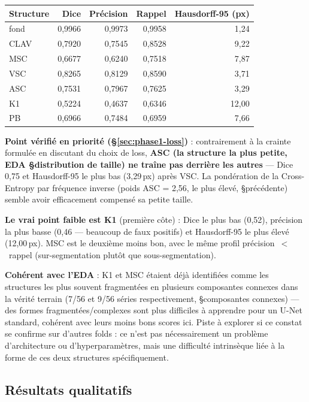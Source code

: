 \begin{center}
\begin{tabular}{lrrrr}
\toprule
Structure & Dice & Précision & Rappel & Hausdorff-95 (px) \\
\midrule
fond & 0,9966 & 0,9973 & 0,9958 & 1,24 \\
CLAV & 0,7920 & 0,7545 & 0,8528 & 9,22 \\
MSC  & 0,6677 & 0,6240 & 0,7518 & 7,87 \\
VSC  & 0,8265 & 0,8129 & 0,8590 & 3,71 \\
ASC  & 0,7531 & 0,7967 & 0,7625 & 3,29 \\
K1   & 0,5224 & 0,4637 & 0,6346 & 12,00 \\
PB   & 0,6966 & 0,7484 & 0,6959 & 7,66 \\
\bottomrule
\end{tabular}
\end{center}

\textbf{Point vérifié en priorité (\S\ref{sec:phase1-loss})} : contrairement à la
crainte formulée en discutant du choix de loss, \textbf{ASC (la structure la plus
petite, EDA \S distribution de taille) ne traîne pas derrière les autres} --- Dice
0,75 et Hausdorff-95 le plus bas (3,29\,px) après VSC. La pondération de la
Cross-Entropy par fréquence inverse (poids ASC = 2,56, le plus élevé, \S précédente)
semble avoir efficacement compensé sa petite taille.

\textbf{Le vrai point faible est K1} (première côte) : Dice le plus bas (0,52),
précision la plus basse (0,46 --- beaucoup de faux positifs) et Hausdorff-95 le plus
élevé (12,00\,px). MSC est le deuxième moins bon, avec le même profil
précision~$<$~rappel (sur-segmentation plutôt que sous-segmentation).

\textbf{Cohérent avec l'EDA} : K1 et MSC étaient déjà identifiées comme les structures
les plus souvent fragmentées en plusieurs composantes connexes dans la vérité terrain
(7/56 et 9/56 séries respectivement, \S composantes connexes) --- des formes
fragmentées/complexes sont plus difficiles à apprendre pour un U-Net standard,
cohérent avec leurs moins bons scores ici. Piste à explorer si ce constat se confirme
sur d'autres folds : ce n'est pas nécessairement un problème d'architecture ou
d'hyperparamètres, mais une difficulté intrinsèque liée à la forme de ces deux
structures spécifiquement.

\subsection{Résultats qualitatifs}

